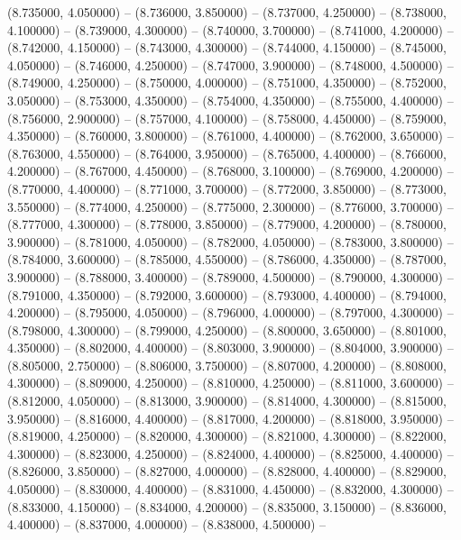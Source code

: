 (8.735000, 4.050000) -- 
(8.736000, 3.850000) -- 
(8.737000, 4.250000) -- 
(8.738000, 4.100000) -- 
(8.739000, 4.300000) -- 
(8.740000, 3.700000) -- 
(8.741000, 4.200000) -- 
(8.742000, 4.150000) -- 
(8.743000, 4.300000) -- 
(8.744000, 4.150000) -- 
(8.745000, 4.050000) -- 
(8.746000, 4.250000) -- 
(8.747000, 3.900000) -- 
(8.748000, 4.500000) -- 
(8.749000, 4.250000) -- 
(8.750000, 4.000000) -- 
(8.751000, 4.350000) -- 
(8.752000, 3.050000) -- 
(8.753000, 4.350000) -- 
(8.754000, 4.350000) -- 
(8.755000, 4.400000) -- 
(8.756000, 2.900000) -- 
(8.757000, 4.100000) -- 
(8.758000, 4.450000) -- 
(8.759000, 4.350000) -- 
(8.760000, 3.800000) -- 
(8.761000, 4.400000) -- 
(8.762000, 3.650000) -- 
(8.763000, 4.550000) -- 
(8.764000, 3.950000) -- 
(8.765000, 4.400000) -- 
(8.766000, 4.200000) -- 
(8.767000, 4.450000) -- 
(8.768000, 3.100000) -- 
(8.769000, 4.200000) -- 
(8.770000, 4.400000) -- 
(8.771000, 3.700000) -- 
(8.772000, 3.850000) -- 
(8.773000, 3.550000) -- 
(8.774000, 4.250000) -- 
(8.775000, 2.300000) -- 
(8.776000, 3.700000) -- 
(8.777000, 4.300000) -- 
(8.778000, 3.850000) -- 
(8.779000, 4.200000) -- 
(8.780000, 3.900000) -- 
(8.781000, 4.050000) -- 
(8.782000, 4.050000) -- 
(8.783000, 3.800000) -- 
(8.784000, 3.600000) -- 
(8.785000, 4.550000) -- 
(8.786000, 4.350000) -- 
(8.787000, 3.900000) -- 
(8.788000, 3.400000) -- 
(8.789000, 4.500000) -- 
(8.790000, 4.300000) -- 
(8.791000, 4.350000) -- 
(8.792000, 3.600000) -- 
(8.793000, 4.400000) -- 
(8.794000, 4.200000) -- 
(8.795000, 4.050000) -- 
(8.796000, 4.000000) -- 
(8.797000, 4.300000) -- 
(8.798000, 4.300000) -- 
(8.799000, 4.250000) -- 
(8.800000, 3.650000) -- 
(8.801000, 4.350000) -- 
(8.802000, 4.400000) -- 
(8.803000, 3.900000) -- 
(8.804000, 3.900000) -- 
(8.805000, 2.750000) -- 
(8.806000, 3.750000) -- 
(8.807000, 4.200000) -- 
(8.808000, 4.300000) -- 
(8.809000, 4.250000) -- 
(8.810000, 4.250000) -- 
(8.811000, 3.600000) -- 
(8.812000, 4.050000) -- 
(8.813000, 3.900000) -- 
(8.814000, 4.300000) -- 
(8.815000, 3.950000) -- 
(8.816000, 4.400000) -- 
(8.817000, 4.200000) -- 
(8.818000, 3.950000) -- 
(8.819000, 4.250000) -- 
(8.820000, 4.300000) -- 
(8.821000, 4.300000) -- 
(8.822000, 4.300000) -- 
(8.823000, 4.250000) -- 
(8.824000, 4.400000) -- 
(8.825000, 4.400000) -- 
(8.826000, 3.850000) -- 
(8.827000, 4.000000) -- 
(8.828000, 4.400000) -- 
(8.829000, 4.050000) -- 
(8.830000, 4.400000) -- 
(8.831000, 4.450000) -- 
(8.832000, 4.300000) -- 
(8.833000, 4.150000) -- 
(8.834000, 4.200000) -- 
(8.835000, 3.150000) -- 
(8.836000, 4.400000) -- 
(8.837000, 4.000000) -- 
(8.838000, 4.500000) -- 

